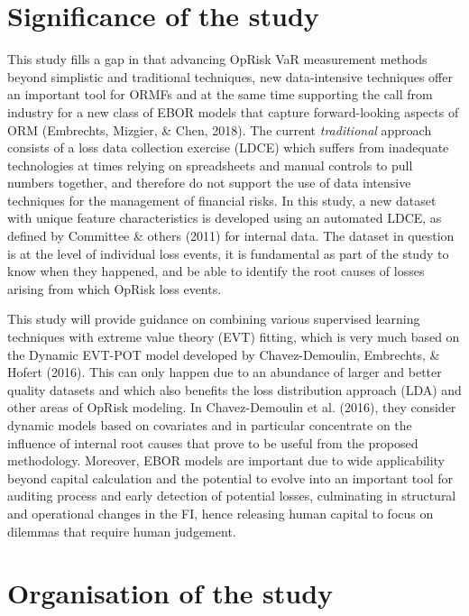 \documentclass{DissertateUSU}
\begin{document}
\section{Significance of the study}
\label{sec:Significance of the study}

This study fills a gap in that advancing OpRisk VaR measurement methods
beyond simplistic and traditional techniques, new data-intensive
techniques offer an important tool for ORMFs and at the same time
supporting the call from industry for a new class of EBOR models that
capture forward-looking aspects of ORM (Embrechts, Mizgier, \& Chen,
2018). The current \emph{traditional} approach consists of a loss data
collection exercise (LDCE) which suffers from inadequate technologies at
times relying on spreadsheets and manual controls to pull numbers
together, and therefore do not support the use of data intensive
techniques for the management of financial risks. In this study, a new
dataset with unique feature characteristics is developed using an
automated LDCE, as defined by Committee \& others (2011) for internal
data. The dataset in question is at the level of individual loss events,
it is fundamental as part of the study to know when they happened, and
be able to identify the root causes of losses arising from which OpRisk
loss events.\medskip 

This study will provide guidance on combining various supervised
learning techniques with extreme value theory (EVT) fitting, which is
very much based on the Dynamic EVT-POT model developed by
Chavez-Demoulin, Embrechts, \& Hofert (2016). This can only happen due
to an abundance of larger and better quality datasets and which also
benefits the loss distribution approach (LDA) and other areas of OpRisk
modeling. In Chavez-Demoulin et al. (2016), they consider dynamic models
based on covariates and in particular concentrate on the influence of
internal root causes that prove to be useful from the proposed
methodology. Moreover, EBOR models are important due to wide
applicability beyond capital calculation and the potential to evolve
into an important tool for auditing process and early detection of
potential losses, culminating in structural and operational changes in
the FI, hence releasing human capital to focus on dilemmas that require
human judgement.

\section{Organisation of the study}
\label{sec:Organisation of the study}
\end{document}

